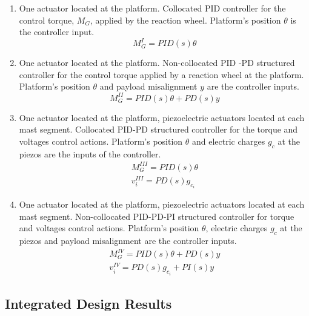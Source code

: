 \documentclass{ifacconf}
\begin{document}
\begin{enumerate}[I]
\item One actuator located at the platform. Collocated PID controller for the control torque, $M_G$, applied by the reaction wheel. Platform's position $\theta$ is the controller input.
\begin{equation}
M_G^I = PID(s) \theta 
\end{equation}
\item One actuator located at the platform. Non-collocated PID -PD structured controller for the control torque applied by a reaction wheel at the platform. Platform's position $\theta$ and payload misalignment $y$ are the controller inputs.
\begin{equation}
M_G ^{II} = PID(s) \theta + PD(s) y
\end{equation}

\item One actuator located at the platform, piezoelectric actuators located at each mast segment. Collocated PID-PD structured controller for the torque and voltages control actions. Platform's position $\theta$ and electric charges $g_c$ at the piezos are the inputs of the controller.
\begin{equation}
\begin{aligned}
M_G ^{III} = PID(s) \theta \\
v_i ^{III} = PD(s) g_{c_i}
\end{aligned}
\end{equation}
\item One actuator located at the platform, piezoelectric actuators located at each mast segment. Non-collocated PID-PD-PI structured controller for torque and voltages control actions. Platform's position $\theta$, electric charges $g_c$ at the piezos and payload misalignment are the controller inputs.
\begin{equation}
\begin{aligned}
M_G ^{IV} = PID(s) \theta + PD(s) y \\
v_i ^{IV} = PD(s) g_{c_i} + PI(s) y
\end{aligned}
\end{equation}
\end{enumerate}


\subsection{Integrated Design Results}
\end{document}
